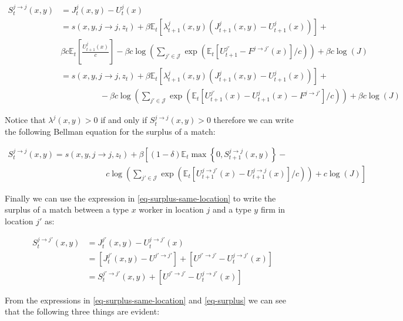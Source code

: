 \documentclass[
  letterpaper,
  DIV=11,
  numbers=noendperiod]{scrreprt}
\begin{document}
\begin{align*}
S^{j\to j}_{t}(x,y) &= J^{j}_{t}(x,y) - U^{j}_t(x) \\
&= s(x,y,j \to j, z_t)+ \beta\mathbb{E}_t\left[\lambda^j_{t+1}(x,y)\left(J^j_{t+1}(x,y) - U^j_{t+1}(x)\right)\right] + \\&\beta c \mathbb{E}_t\left[\frac{U^{j}_{t+1}(x)}{c}\right] -   \beta c \log{\left( \sum_{j' \in \mathcal{J}}\exp{\left(\mathbb{E}_t[U_{t+1}^{j'} - F^{j \to j'}(x)]/c\right)}\right) + \beta c \log{(J)}}\\
&= s(x,y,j \to j, z_t)+ \beta\mathbb{E}_t\left[\lambda^j_{t+1}(x,y)\left(J^j_{t+1}(x,y) - U^j_{t+1}(x)\right)\right] + \\&\hspace{2cm} -   \beta c \log{\left( \sum_{j' \in \mathcal{J}}\exp{\left(\mathbb{E}_t[U_{t+1}^{j'}(x) - U_{t+1}^{j}(x) - F^{j \to j'}]/c\right)}\right) + \beta c \log{(J)}}
\end{align*}

Notice that \(\lambda^{j}(x,y) > 0\) if and only if
\(S^{j\to j}_{t}(x,y) > 0\) therefore we can write the following Bellman
equation for the surplus of a match:

\begin{align}\label{eq-surplus-same-location}
S_{t}^{j \to j}(x,y) = s(x,y,j \to j, z_t) + \beta \left[(1-\delta)\mathbb{E}_{t}\max\left\{0, S_{t+1}^{j \to j}(x,y)\right\} - \right. \nonumber \\ \left. \hspace{5cm} 
c \log{\left( \sum_{j' \in \mathcal{J}}\exp{\left(\mathbb{E}_t[U_{t+1}^{j \to j'}(x) - U_{t+1}^{j \to j}(x)]/c\right)}\right) + c \log{(J)}} \right]
\end{align}

Finally we can use the expression in \eqref{eq-surplus-same-location} to
write the surplus of a match between a type \(x\) worker in location
\(j\) and a type \(y\) firm in location \(j'\) as:

\begin{align}\label{eq-surplus}
S_{t}^{j\to j'}(x,y) &= J^{j'}_{t}(x,y) - U^{j\to j'}_t(x) \nonumber \\
&= \left[J^{j'}_{t}(x,y) - U^{j' \to j'}\right] + \left[U^{j' \to j'}- U^{j\to j'}_t(x) \right]\\
&= S_{t}^{j' \to j'}(x,y)+ \left[U^{j' \to j'}- U^{j\to j'}_t(x) \right]
\end{align}

From the expressions in \eqref{eq-surplus-same-location} and
\eqref{eq-surplus} we can see that the following three things are
evident:
\end{document}
